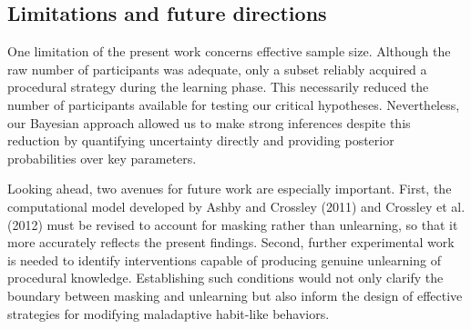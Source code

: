 \documentclass{article}
\begin{document}
\subsection{Limitations and future directions}
One limitation of the present work concerns effective sample
size. Although the raw number of participants was adequate,
only a subset reliably acquired a procedural strategy during
the learning phase. This necessarily reduced the number of
participants available for testing our critical hypotheses.
Nevertheless, our Bayesian approach allowed us to make
strong inferences despite this reduction by quantifying
uncertainty directly and providing posterior probabilities
over key parameters.

Looking ahead, two avenues for future work are especially
important. First, the computational model developed by Ashby
and Crossley (2011) and Crossley et al. (2012) must be
revised to account for masking rather than unlearning, so
that it more accurately reflects the present findings.
Second, further experimental work is needed to identify
interventions capable of producing genuine unlearning of
procedural knowledge. Establishing such conditions would not
only clarify the boundary between masking and unlearning but
also inform the design of effective strategies for modifying
maladaptive habit-like behaviors.
\end{document}
